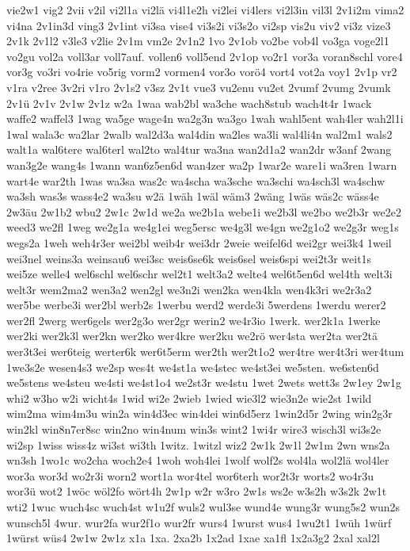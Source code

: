 {vie2w1
vig2
2vii
v2il
vi2l1a
vi2lä
vi4l1e2h
vi2lei
vi4lers
vi2l3in
vil3l
2v1i2m
vima2
vi4na
2v1in3d
ving3
2v1int
vi3sa
vise4
vi3s2i
vi3s2o
vi2sp
vis2u
viv2
vi3z
vize3
2v1k
2v1l2
v3le3
v2lie
2v1m
vm2e
2v1n2
1vo
2v1ob
vo2be
vob4l
vo3ga
voge2l1
vo2gu
vol2a
voll3ar
voll7auf.
vollen6
voll5end
2v1op
vo2r1
vor3a
voran8schl
vore4
vor3g
vo3ri
vo4rie
vo5rig
vorm2
vormen4
vor3o
vorö4
vort4
vot2a
voy1
2v1p
vr2
v1ra
v2ree
3v2ri
v1ro
2v1s2
v3sz
2v1t
vue3
vu2enu
vu2et
2vumf
2vumg
2vumk
2v1ü
2v1v
2v1w
2v1z
w2a
1waa
wab2bl
wa3che
wach8stub
wach4t4r
1wack
waffe2
waffel3
1wag
wa5ge
wage4n
wa2g3n
wa3go
1wah
wahl5ent
wah4ler
wah2l1i
1wal
wala3c
wa2lar
2walb
wal2d3a
wal4din
wa2les
wa3li
wal4li4n
wal2m1
wals2
walt1a
wal6tere
wal6terl
wal2to
wal4tur
wa3na
wan2d1a2
wan2dr
w3anf
2wang
wan3g2e
wang4s
1wann
wan6z5en6d
wan4zer
wa2p
1war2e
ware1i
wa3ren
1warn
wart4e
war2th
1was
wa3sa
was2c
wa4scha
wa3sche
wa3schi
wa4sch3l
wa4schw
wa3sh
was3s
wass4e2
wa3su
w2ä
1wäh
1wäl
wäm3
2wäng
1wäs
wäs2c
wäss4e
2w3äu
2w1b2
wbu2
2w1c
2w1d
we2a
we2b1a
webe1i
we2b3l
we2bo
we2b3r
we2e2
weed3
we2fl
1weg
we2g1a
we4g1ei
weg5ersc
we4g3l
we4gn
we2g1o2
we2g3r
weg1s
wegs2a
1weh
weh4r3er
wei2bl
weib4r
wei3dr
2weie
weifel6d
wei2gr
wei3k4
1weil
wei3nel
weins3a
weinsau6
wei3sc
weis6se6k
weis6sel
weis6spi
wei2t3r
weit1s
wei5ze
welle4
wel6schl
wel6schr
wel2t1
welt3a2
welte4
wel6t5en6d
wel4th
welt3i
welt3r
wem2ma2
wen3a2
wen2gl
we3n2i
wen2ka
wen4kla
wen4k3ri
we2r3a2
wer5be
werbe3i
wer2bl
werb2s
1werbu
werd2
werde3i
5werdens
1werdu
werer2
wer2fl
2werg
wer6gels
wer2g3o
wer2gr
werin2
we4r3io
1werk.
wer2k1a
1werke
wer2ki
wer2k3l
wer2kn
wer2ko
wer4kre
wer2ku
we2rö
wer4sta
wer2ta
wer2tä
wer3t3ei
wer6teig
werter6k
wer6t5erm
wer2th
wer2t1o2
wer4tre
wer4t3ri
wer4tum
1we3s2e
wesen4s3
we2sp
wes4t
we4st1a
we4stec
we4st3ei
we5sten.
we6sten6d
we5stens
we4steu
we4sti
we4st1o4
we2st3r
we4stu
1wet
2wets
wett3s
2w1ey
2w1g
whi2
w3ho
w2i
wicht4s
1wid
wi2e
2wieb
1wied
wie3l2
wie3n2e
wie2st
1wild
wim2ma
wim4m3u
win2a
win4d3ec
win4dei
win6d5erz
1win2d5r
2wing
win2g3r
win2kl
win8n7er8sc
win2no
win4num
win3s
wint2
1wi4r
wire3
wisch3l
wi3s2e
wi2sp
1wiss
wiss4z
wi3st
wi3th
1witz.
1witzl
wiz2
2w1k
2w1l
2w1m
2wn
wns2a
wn3sh
1wo1c
wo2cha
woch2e4
1woh
woh4lei
1wolf
wolf2s
wol4la
wol2lä
wol4ler
wor3a
wor3d
wo2r3i
worn2
wort1a
wor4tel
wor6terh
wor2t3r
worts2
wo4r3u
wor3ü
wot2
1wöc
wöl2fo
wört4h
2w1p
w2r
w3ro
2w1s
ws2e
w3s2h
w3s2k
2w1t
wti2
1wuc
wuch4sc
wuch4st
w1u2f
wuls2
wul3se
wund4e
wung3r
wung5s2
wun2s
wunsch5l
4wur.
wur2fa
wur2f1o
wur2fr
wurs4
1wurst
wus4
1wu2t1
1wüh
1würf
1würst
wüs4
2w1w
2w1z
x1a
1xa.
2xa2b
1x2ad
1xae
xa1fl
1x2a3g2
2xal
xal2l
}

